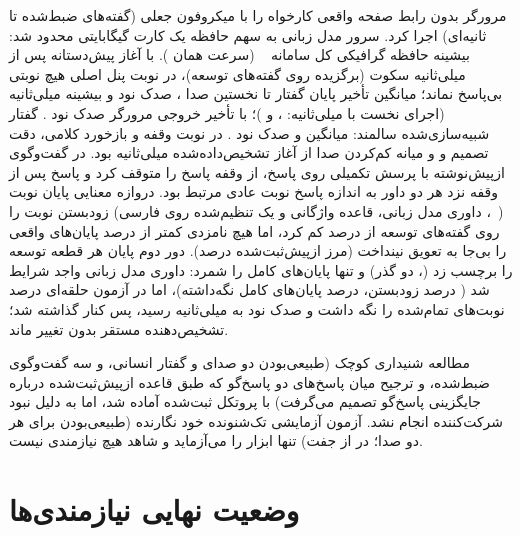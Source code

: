 مرورگر بدون رابط صفحه واقعی کارخواه را با میکروفون جعلی (گفته‌های ضبط‌شده
 تا  ثانیه‌ای) اجرا کرد. سرور مدل زبانی به سهم حافظه یک کارت 
گیگابایتی محدود شد: بیشینه حافظه گرافیکی کل سامانه ~ (سرعت
همان ). با آغاز پیش‌دستانه پس از  میلی‌ثانیه سکوت (برگزیده روی
گفته‌های توسعه)، در  نوبت پنل اصلی هیچ نوبتی بی‌پاسخ نماند؛ میانگین
تأخیر پایان گفتار تا نخستین صدا \textbf{}، صدک نود \textbf{} و
بیشینه  میلی‌ثانیه (اجرای نخست با  میلی‌ثانیه: ،  و
)؛ با تأخیر خروجی مرورگر صدک نود . گفتار شبیه‌سازی‌شده سالمند:
میانگین  و صدک نود . در
 نوبت وقفه و بازخورد کلامی، دقت تصمیم  و   و
میانه کم‌کردن صدا از آغاز تشخیص‌داده‌شده  میلی‌ثانیه بود. در  گفت‌وگوی
ازپیش‌نوشته با پرسش تکمیلی روی پاسخ،  از  وقفه پاسخ را متوقف کرد و پاسخ
پس از وقفه نزد هر دو داور به اندازه پاسخ نوبت عادی مرتبط بود. دروازه معنایی پایان
نوبت (~\cite{smartturn2025}، داوری مدل زبانی، قاعده واژگانی و یک
 تنظیم‌شده روی فارسی) زودبستن نوبت را روی گفته‌های توسعه از 
درصد کم کرد، اما هیچ نامزدی کمتر از  درصد پایان‌های واقعی را بی‌جا به تعویق
نینداخت (مرز ازپیش‌ثبت‌شده  درصد). دور دوم پایان هر قطعه توسعه را برچسب زد
(، دو گذر) و تنها پایان‌های کامل را شمرد: داوری مدل زبانی واجد شرایط شد
( درصد زودبستن،  درصد پایان‌های کامل نگه‌داشته)، اما در آزمون
حلقه‌ای  درصد نوبت‌های تمام‌شده را نگه داشت و صدک نود به  میلی‌ثانیه
رسید، پس کنار گذاشته شد؛ تشخیص‌دهنده مستقر بدون تغییر ماند.


مطالعه شنیداری کوچک (طبیعی‌بودن دو صدای  و گفتار انسانی، و سه
گفت‌وگوی ضبط‌شده، و ترجیح میان پاسخ‌های دو پاسخ‌گو که طبق قاعده ازپیش‌ثبت‌شده
درباره جایگزینی پاسخ‌گو تصمیم می‌گرفت) با پروتکل ثبت‌شده آماده شد، اما به دلیل نبود
شرکت‌کننده انجام نشد. آزمون آزمایشی تک‌شنونده خود نگارنده (طبیعی‌بودن  برای
هر دو صدا؛  در  از  جفت) تنها ابزار را می‌آزماید و شاهد
هیچ نیازمندی نیست.

\section{وضعیت نهایی نیازمندی‌ها}
\label{sec:res-requirements}

